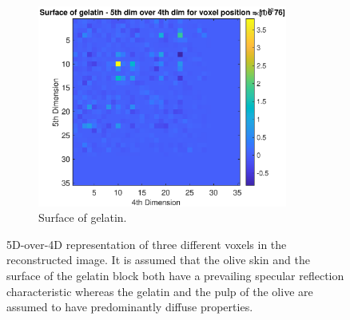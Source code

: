 \begin{figure}[H]
\begin{subfigure}[b]{0.69\textwidth}
     \end{subfigure}
          \hfill
     \begin{subfigure}[b]{0.69\textwidth}
         \centering
         \includegraphics[width=0.9\textwidth]{Graphics/Results/skin_pulp_stone_5D_4D_Skin.eps}
         \caption{Surface of gelatin. }
         \label{fig:res:5D_4D_skin_pulp_compare_skin}
     \end{subfigure}
        \caption{ 5D-over-4D representation of three different voxels in the reconstructed image. It is assumed that the olive skin and the surface of the gelatin block both have a prevailing specular reflection characteristic whereas the gelatin and the pulp of the olive are assumed to have predominantly diffuse properties. }
        \label{fig:res:5D_4D_skin_pulp_compare}
\end{figure}

 




\medskip



